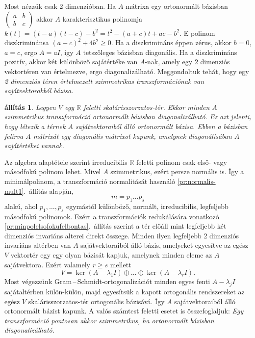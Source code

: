 \documentclass[9pt, a4paper, showtrims]{memoir}
\makeatletter
\renewenvironment{proof}[1][\proofname]
    {\par\pushQED{\qed}%
    \normalfont \topsep6\p@\@plus6\p@\relax
    \trivlist
    \item[\hskip\labelsep
        \itshape
    #1\@addpunct{:}]\ignorespaces}
    {\popQED\endtrivlist\@endpefalse}
\theoremstyle{plain}
\newtheorem{proposition}{állítás}[chapter]
\theoremstyle{remark}
\theoremstyle{definition}
\makeatother
\begin{document}
Most nézzük csak 2 dimenzióban.
Ha $A$ mátrixa egy ortonormált bázisban
\begin{math}
	\begin{pmatrix}
		a & b \\b&c
	\end{pmatrix}
\end{math}
akkor $A$ karakterisztikus polinomja 
$   k\left( t \right)
    =
    \left( t-a \right)\left( t-c \right)-b^2
    =
    t^2-\left( a+c \right)t+ac-b^2.$
E polinom diszkriminánsa 
\(
    \left( a-c \right)^2+4b^2\geq 0.
\)
Ha a diszkrimináns éppen zérus, akkor $b=0$, $a=c$, ergo $A=aI$, így $A$ tetszőleges bázisban diagonális.
Ha a diszkrimináns pozitív, akkor két különböző sajátértéke van $A$-nak, amely egy 2 dimenziós 
vektortéren van értelmezve, ergo diagonalizálható.
Meggondoltuk tehát, hogy egy
\emph{
	2 dimenziós téren értelmezett szimmetrikus transzformációnak van sajátvektorokból bázisa.
}
\begin{proposition}
	Legyen $V$ egy $\mathbb{R}$ feletti skalárisszorzatos-tér.
	Ekkor minden $A$ szimmetrikus transzformáció ortonormált bázisban diagonalizálható.
	Ez azt jelenti, hogy létezik a térnek $A$ sajátvektoraiból álló ortonormált bázisa.
	Ebben a bázisban felírva $A$ mátrixát egy diagonális mátrixot kapunk,
	amelynek diagonálisában $A$ sajátértékei vannak.
\end{proposition}
\begin{proof}
	Az algebra alaptétele szerint irreducibilis $\mathbb{R}$ feletti polinom
	csak első- vagy másodfokú polinom lehet.
	Mivel $A$ szimmetrikus, ezért persze normális is.
	Így a minimálpolinom, a transzformáció normalitását használó \ref{pr:normalis-mult1}.~állítás alapján,
	\[
		m=p_1\dots p_s
	\]
	alakú, ahol $p_1,\ldots,p_s$ egymástól különböző, normált, irreducibilis, legfeljebb másodfokú polinomok.
	Ezért a transzformációk redukálására vonatkozó \ref{pr:minpolelsofokufelbontas}.~állítás szerint
	a tér előáll mint legfeljebb két dimenziós invariáns alterei direkt összege.
	Minden ilyen legfeljebb 2 dimenziós invariáns altérben van $A$ sajátvektoraiból álló bázis,
	amelyeket egyesítve az egész $V$ vektortér egy egy olyan bázisát kapjuk,
	amelynek minden eleme az $A$ sajátvektora.
	Ezért valamely $r\geq s$ mellett
	\[
		V=\ker\left( A-\lambda_1I \right)\oplus\dots\oplus\ker\left( A-\lambda_rI \right).
	\]
	Most végezzünk Gram\,--\,Schmidt-ortogonalizációt
	minden egyes fenti $A-\lambda_jI$ sajátaltérben külön-külön,
	majd egyesítsük a kapott ortogonális rendszereket az egész $V$ skalárisszorzatos-tér ortogonális bázisává.
	Így $A$ sajátvektoraiból álló ortonormált bázist kapunk.
\end{proof}
A valós számtest feletti esetet is összefoglaljuk:
\emph{
    Egy transzformáció pontosan akkor szimmetrikus, ha ortonormált bázisban diagonalizálható.
}
\end{document}
